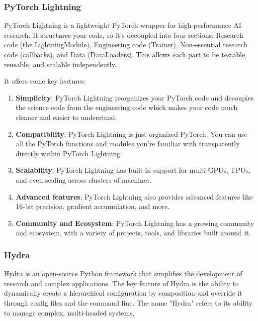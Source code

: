\subsubsection{PyTorch Lightning}
PyTorch Lightning is a lightweight PyTorch wrapper for high-performance AI research. It structures your code, so it's decoupled into four sections: Research code (the LightningModule), Engineering code (Trainer), Non-essential research code (callbacks), and Data (DataLoaders). This allows each part to be testable, reusable, and scalable independently.

It offers some key features:
\begin{enumerate}
    \item \textbf{Simplicity}: PyTorch Lightning reorganizes your PyTorch code and decouples the science code from the engineering code which makes your code much cleaner and easier to understand.
    \item \textbf{Compatibility}: PyTorch Lightning is just organized PyTorch. You can use all the PyTorch functions and modules you're familiar with transparently directly within PyTorch Lightning.
    \item \textbf{Scalability}: PyTorch Lightning has built-in support for multi-GPUs, TPUs, and even scaling across clusters of machines.
    \item \textbf{Advanced features}: PyTorch Lightning also provides advanced features like 16-bit precision, gradient accumulation, and more.
    \item \textbf{Community and Ecosystem}: PyTorch Lightning has a growing community and ecosystem, with a variety of projects, tools, and libraries built around it.
\end{enumerate}

\subsubsection{Hydra}
Hydra is an open-source Python framework that simplifies the development of research and complex applications. The key feature of Hydra is the ability to dynamically create a hierarchical configuration by composition and override it through config files and the command line. The name "Hydra" refers to its ability to manage complex, multi-headed systems.

